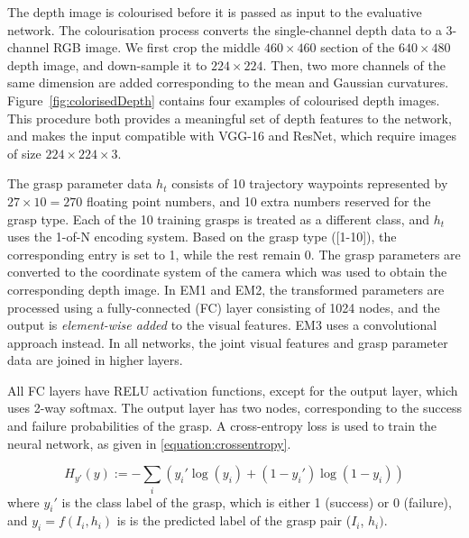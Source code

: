 
The depth image is colourised before it is passed as input to the evaluative network. The colourisation process converts the single-channel depth data to a 3-channel RGB image. We first crop the middle $460 \times 460$ section of the $640 \times 480$ depth image, and down-sample it to $224 \times 224$. Then, two more channels of the same dimension are added corresponding to the mean and Gaussian curvatures. Figure~\ref{fig:colorisedDepth} contains four examples of colourised depth images. This procedure both provides a meaningful set of depth features to the network, and makes the input compatible with VGG-16 and ResNet, which require images of size $224 \times 224 \times 3$.

The grasp parameter data $h_t$ consists of 10 trajectory waypoints represented by $27 \times 10 = 270$ floating point numbers, and 10 extra numbers reserved for the grasp type. Each of the 10 training grasps is treated as a different class, and $h_t$ uses the 1-of-N encoding system. Based on the grasp type ([1-10]), the corresponding entry is set to 1, while the rest remain 0. The grasp parameters are converted to the coordinate system of the camera which was used to obtain the corresponding depth image. In EM1 and EM2, the transformed parameters are processed using a fully-connected (FC) layer consisting of 1024 nodes, and the output is \textit{element-wise added} to the visual features. EM3 uses a convolutional approach instead. In all networks, the joint visual features and grasp parameter data are joined in higher layers.

All FC layers have RELU activation functions, except for the output layer, which uses 2-way softmax. The output layer has two nodes, corresponding to the success and failure probabilities of the grasp. A cross-entropy loss is used to train the neural network, as given in \eq\ref{equation:crossentropy}.

\begin{equation}
H_{y'}(y) := - \sum_{i} ({y_i' \log(y_i) + (1-y_i') \log (1-y_i)})
\label{equation:crossentropy}
\end{equation}
where $y_i'$ is the class label of the grasp, which is either 1 (success) or 0 (failure), and $y_i = f(I_i, h_i)$ is is the predicted label of the grasp pair ($I_i$, $h_i)$.

